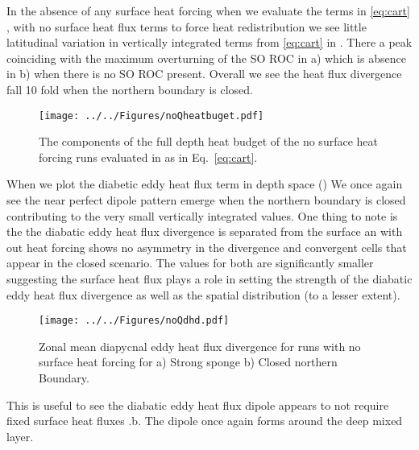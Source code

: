 In the absence of any surface heat forcing when we evaluate the terms in \ref{eq:cart} , with no surface heat flux terms to force heat redistribution we see little latitudinal variation in vertically integrated terms from \ref{eq:cart} in . There a peak coinciding with the maximum overturning of the SO ROC in a) which is absence in b) when there is no SO ROC present. Overall we see the heat flux divergence fall 10 fold when the northern boundary is closed.
\begin{figure}[H]
\center
\noindent \texttt{[image: ../../Figures/noQheatbuget.pdf]} 
\caption{The components of the full depth heat budget of the no surface heat forcing runs evaluated in as in \protect Eq.~\ref{eq:cart}.}
\label{fig:noqQbudget}
\end{figure}
When we plot the diabetic eddy heat flux term in depth space () We once again see the near perfect dipole pattern emerge when the northern boundary is closed contributing to the very small vertically integrated values. One thing to note is the the diabatic eddy heat flux divergence is separated from the surface an with out heat forcing shows no asymmetry in the divergence and convergent cells that appear in the closed scenario. The values for both are significantly smaller suggesting the surface heat flux plays a role in setting the strength of the diabatic eddy heat flux divergence as well as the spatial distribution (to a lesser extent).
\begin{figure}[H]
\center
\noindent \texttt{[image: ../../Figures/noQdhd.pdf]} 
\caption{Zonal mean diapycnal eddy heat flux divergence for runs with no surface heat forcing for a) Strong sponge b) Closed northern Boundary.}
\label{fig:noQdhd}
\end{figure}
This is useful to see the diabatic eddy heat flux dipole appears to not require fixed surface heat fluxes .b. The dipole once again forms around the deep mixed layer. 

